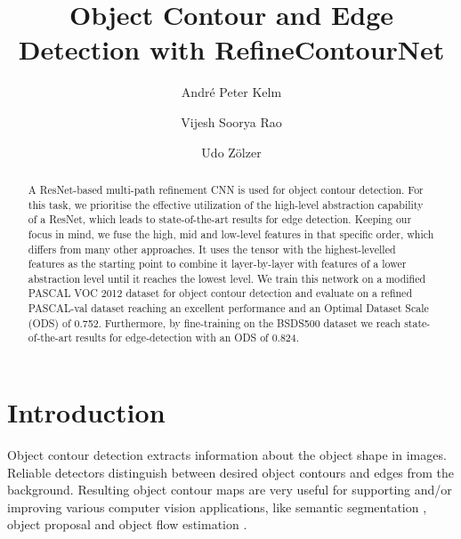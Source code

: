 \documentclass[runningheads]{llncs}
\begin{document}
\title{Object Contour and Edge Detection with RefineContourNet}
\author{Andr\'{e} Peter Kelm \and
Vijesh Soorya Rao \and
Udo Z\"olzer }
\maketitle              \begin{abstract}


A ResNet-based multi-path refinement CNN is used for object contour detection. For this task, we prioritise the effective utilization of the high-level abstraction capability of a ResNet, which leads to state-of-the-art results for edge detection. Keeping our focus in mind, we fuse the high, mid and low-level features in that specific order, which differs from many other approaches. It uses the tensor with the highest-levelled features as the starting point to combine it layer-by-layer with features of a  lower abstraction level until it reaches the lowest level. We train this network on a modified PASCAL VOC 2012 dataset for object contour detection and evaluate on a refined PASCAL-val dataset reaching an excellent performance and an Optimal Dataset Scale (ODS) of 0.752. Furthermore, by fine-training on the BSDS500 dataset we reach state-of-the-art results for edge-detection with an ODS of 0.824.

\end{abstract}
\section{Introduction}
Object contour detection extracts information about the object shape in images. Reliable detectors distinguish between desired object contours and edges from the background. Resulting object contour maps are very useful for supporting and/or improving various computer vision applications, like semantic segmentation \cite{SegmBoundaryFields,CED,DisFeatLearningVideoSegm}, object proposal \cite{MultiScaleGroupingObjProp} and object flow estimation \cite{OpticalFlow,CED}.
\end{document}
